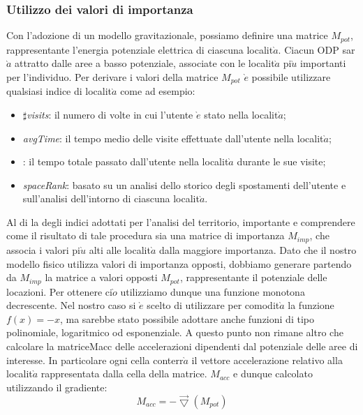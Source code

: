 \subsubsection{Utilizzo dei valori di importanza}
Con l'adozione di un modello gravitazionale, possiamo definire una matrice
$M_{pot}$, rappresentante l'energia potenziale elettrica di ciascuna localit$\grave{a}$. Ciacun
ODP sar$\grave{a}$ attratto dalle aree a basso potenziale, associate con le localit$\grave{a}$ pi$\grave{u}$
importanti per l'individuo.
Per derivare i valori della matrice $M_{pot}$ $\grave{e}$ possibile utilizzare qualsiasi indice di
localit$\grave{a}$ come ad esempio:
\begin{itemize}
\item $\sharp$\textit{visits}: il numero di volte in cui l'utente $\grave{e}$ stato nella localit$\grave{a}$;
\item \textit{avgTime}: il tempo medio delle visite effettuate dall'utente nella localit$\grave{a}$;
\item {}: il tempo totale passato dall'utente nella localit$\grave{a}$ durante le sue
visite;
\item \textit{spaceRank}: basato su un analisi dello storico degli spostamenti dell'utente
e sull'analisi dell'intorno di ciascuna localit$\grave{a}$.
\end{itemize}
Al di la degli indici adottati per l'analisi del territorio, importante e comprendere
come il risultato di tale procedura sia una matrice di importanza
$M_{imp}$, che associa i valori pi$\grave{u}$ alti alle localit$\grave{a}$ dalla maggiore importanza. Dato
che il nostro modello fisico utilizza valori di importanza opposti, dobbiamo
generare partendo da $M_{imp}$ la matrice a valori opposti $M_{pot}$, rappresentante il
potenziale delle locazioni. Per ottenere ci$\grave{o}$ utilizziamo dunque una funzione
monotona decrescente. Nel nostro caso si $\grave{e}$ scelto di utilizzare per comodit$\grave{a}$
la funzione $f(x)=-x$, ma sarebbe stato possibile adottare anche funzioni di tipo
polinomiale, logaritmico od esponenziale. A questo punto non rimane altro che
calcolare la matriceMacc delle accelerazioni dipendenti dal potenziale delle aree
di interesse. In particolare ogni cella conterr$\grave{a}$ il vettore accelerazione relativo
alla localit$\grave{a}$ rappresentata dalla cella della matrice. $M_{acc}$ e dunque calcolato
utilizzando il gradiente:
\begin{equation}
M_{acc} = - \vec{\bigtriangledown}(M_{pot})
\end{equation}
